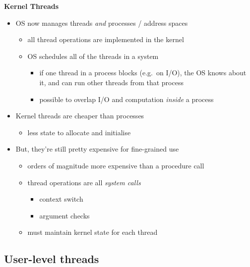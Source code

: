 \documentclass[11pt,a4paper]{article}
\begin{document}
\textbf{Kernel Threads}
\begin{itemize}
    \item OS now manages threads \emph{and} processes / address spaces
        \begin{itemize}
            \item all thread operations are implemented in the kernel
            \item OS schedules all of the threads in a system
                \begin{itemize}
                    \item if one thread in a process blocks (e.g.\ on I/O),
                        the OS knows about it, and can run other threads from that process
                    \item possible to overlap I/O and computation \emph{inside} a process
                \end{itemize}
        \end{itemize}
    \item Kernel threads are cheaper than processes
        \begin{itemize}
            \item less state to allocate and initialise
        \end{itemize}
    \item But, they're still pretty expensive for fine-grained use
        \begin{itemize}
            \item orders of magnitude more expensive than a procedure call
            \item thread operations are all \emph{system calls}
                \begin{itemize}
                    \item context switch
                    \item argument checks
                \end{itemize}
            \item must maintain kernel state for each thread
        \end{itemize}
\end{itemize}

\subsection{User-level threads}
\end{document}
